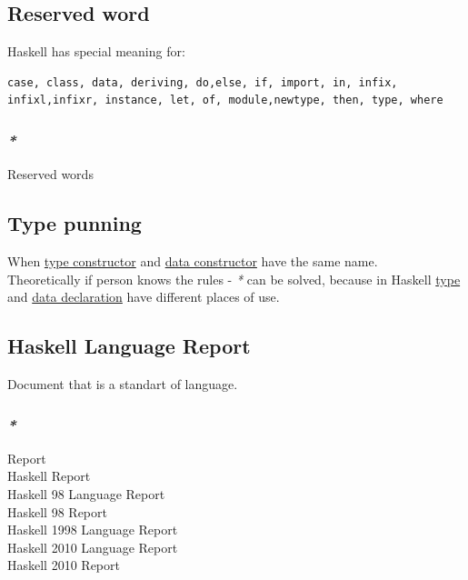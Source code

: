 \documentclass[11pt]{article}
\begin{document}
\subsection{\label{orgfbdfdc9}Reserved word}
\label{sec:org5078a3c}
Haskell has special meaning for:\\
\begin{verbatim}
case, class, data, deriving, do,else, if, import, in, infix, infixl,infixr, instance, let, of, module,newtype, then, type, where
\end{verbatim}

\subsubsection{\emph{*}}
\label{sec:org9c5e3ca}
\label{org4b7fa53}Reserved words\\

\subsection{\label{org43b5dbe}Type punning}
\label{sec:org9cc4459}
When \hyperref[org7285f45]{type constructor} and \hyperref[org6dad980]{data constructor} have the same name.\\

Theoretically if person knows the rules - \emph{*} can be solved, because in Haskell \hyperref[org4fbaeb8]{type} and \hyperref[org9b3601c]{data declaration} have different places of use.\\

\subsection{\label{org16c00ec}Haskell Language Report}
\label{sec:org44c8aaa}
Document that is a standart of language.\\

\subsubsection{\emph{*}}
\label{sec:org034cea7}
\label{orgfb449df}Report\\
\label{orgac393ce}Haskell Report\\
\label{orga1079ee}Haskell 98 Language Report\\
\label{org4f96105}Haskell 98 Report\\
\label{orgb4a344c}Haskell 1998 Language Report\\
\label{orgf641460}Haskell 2010 Language Report\\
\label{orge41880b}Haskell 2010 Report\\
\end{document}
